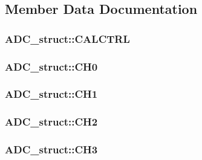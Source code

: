 \subsection{Member Data Documentation}
\hypertarget{struct_a_d_c__struct_a3cc4bacbcc63ef7efb42fc9a86f13993}{
\subsubsection[{CALCTRL}]{ {\bf ADC\_\-struct::CALCTRL}}}
\label{struct_a_d_c__struct_a3cc4bacbcc63ef7efb42fc9a86f13993}
\hypertarget{struct_a_d_c__struct_a031b0ee3a3a275f873139d0be7c8ca33}{
\subsubsection[{CH0}]{ {\bf ADC\_\-struct::CH0}}}
\label{struct_a_d_c__struct_a031b0ee3a3a275f873139d0be7c8ca33}
\hypertarget{struct_a_d_c__struct_a2a4ebcba2cc0703c6234c0eef74a4a23}{
\subsubsection[{CH1}]{ {\bf ADC\_\-struct::CH1}}}
\label{struct_a_d_c__struct_a2a4ebcba2cc0703c6234c0eef74a4a23}
\hypertarget{struct_a_d_c__struct_a083f51d07f55fabe5c3924dd772c33b4}{
\subsubsection[{CH2}]{ {\bf ADC\_\-struct::CH2}}}
\label{struct_a_d_c__struct_a083f51d07f55fabe5c3924dd772c33b4}
\hypertarget{struct_a_d_c__struct_a7db8f07670252839c4a656b775eec0a4}{
\subsubsection[{CH3}]{ {\bf ADC\_\-struct::CH3}}}
